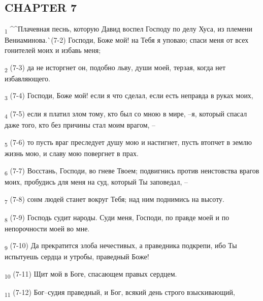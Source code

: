 \subsection{CHAPTER 7}
\begin{tcolorbox}
\textsubscript{1} ^^Плачевная песнь, которую Давид воспел Господу по делу Хуса, из племени Вениаминова.^^ (7-2) Господи, Боже мой! на Тебя я уповаю; спаси меня от всех гонителей моих и избавь меня;
\end{tcolorbox}
\begin{tcolorbox}
\textsubscript{2} (7-3) да не исторгнет он, подобно льву, души моей, терзая, когда нет избавляющего.
\end{tcolorbox}
\begin{tcolorbox}
\textsubscript{3} (7-4) Господи, Боже мой! если я что сделал, если есть неправда в руках моих,
\end{tcolorbox}
\begin{tcolorbox}
\textsubscript{4} (7-5) если я платил злом тому, кто был со мною в мире, --я, который спасал даже того, кто без причины стал моим врагом, --
\end{tcolorbox}
\begin{tcolorbox}
\textsubscript{5} (7-6) то пусть враг преследует душу мою и настигнет, пусть втопчет в землю жизнь мою, и славу мою повергнет в прах.
\end{tcolorbox}
\begin{tcolorbox}
\textsubscript{6} (7-7) Восстань, Господи, во гневе Твоем; подвигнись против неистовства врагов моих, пробудись для меня на суд, который Ты заповедал, --
\end{tcolorbox}
\begin{tcolorbox}
\textsubscript{7} (7-8) сонм людей станет вокруг Тебя; над ним поднимись на высоту.
\end{tcolorbox}
\begin{tcolorbox}
\textsubscript{8} (7-9) Господь судит народы. Суди меня, Господи, по правде моей и по непорочности моей во мне.
\end{tcolorbox}
\begin{tcolorbox}
\textsubscript{9} (7-10) Да прекратится злоба нечестивых, а праведника подкрепи, ибо Ты испытуешь сердца и утробы, праведный Боже!
\end{tcolorbox}
\begin{tcolorbox}
\textsubscript{10} (7-11) Щит мой в Боге, спасающем правых сердцем.
\end{tcolorbox}
\begin{tcolorbox}
\textsubscript{11} (7-12) Бог--судия праведный, и Бог, всякий день строго взыскивающий,
\end{tcolorbox}
